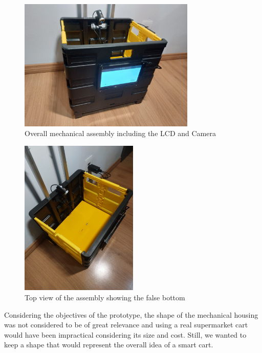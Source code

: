 \documentclass[openright]{normas-utf-tex} %
\begin{document}
\begin{figure}[H]
	\centering
	\includegraphics[width=0.75\textwidth]{./images/cart.jpeg}
	\caption[Overall mechanical assembly including the LCD and Camera]{Overall mechanical assembly including the LCD and Camera}
\end{figure}

\begin{figure}[H]
	\centering
	\includegraphics[width=0.5\textwidth]{./images/carttop.jpeg}
	\caption[Top view of the assembly showing the false bottom]{Top view of the assembly showing the false bottom}
\end{figure}

Considering the objectives of the prototype, the shape of the mechanical
housing was not considered to be of great relevance and using a real
supermarket cart would have been impractical considering its size and cost. Still, we wanted
to keep a shape that would represent the overall idea of a smart cart.
\end{document}
